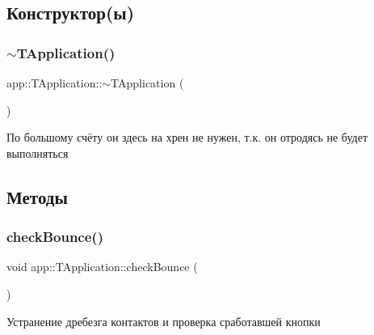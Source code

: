 \subsection{Конструктор(ы)}
\mbox{\label{classapp_1_1_t_application_a5b7af31c95dab9a3f14ee792429a0737}} 
\subsubsection{\texorpdfstring{$\sim$\+T\+Application()}{~TApplication()}}
{\footnotesize\ttfamily app\+::\+T\+Application\+::$\sim$\+T\+Application (\begin{DoxyParamCaption}{ }\end{DoxyParamCaption})\hspace{0.3cm}{\ttfamily [virtual]}}



По большому счёту он здесь на хрен не нужен, т.\+к. он отродясь не будет выполняться 



 

\subsection{Методы}
\mbox{\label{classapp_1_1_t_application_a4c4d1d33ea8ab73ba49a59528d200501}} 
\subsubsection{\texorpdfstring{check\+Bounce()}{checkBounce()}}
{\footnotesize\ttfamily void app\+::\+T\+Application\+::check\+Bounce (\begin{DoxyParamCaption}{ }\end{DoxyParamCaption})}



Устранение дребезга контактов и проверка сработавшей кнопки 

